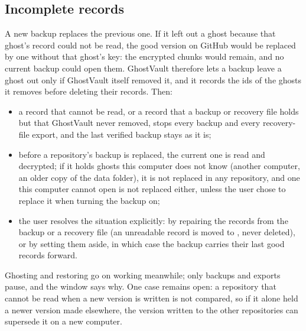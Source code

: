 \subsection{Incomplete records}\label{sec:incomplete}
A new backup replaces the previous one. If it left out a ghost because that ghost's record could not
be read, the good version on GitHub would be replaced by one without that ghost's key: the encrypted
chunks would remain, and no current backup could open them. GhostVault therefore lets a backup leave a
ghost out only if GhostVault itself removed it, and it records the ids of the ghosts it removes before
deleting their records. Then:
\begin{itemize}
\item a record that cannot be read, or a record that a backup or recovery file holds but that
GhostVault never removed, stops every backup and every recovery-file export, and the last verified
backup stays as it is;
\item before a repository's backup is replaced, the current one is read and decrypted; if it holds
ghosts this computer does not know (another computer, an older copy of the data folder), it is not
replaced in any repository, and one this computer cannot open is not replaced either, unless the user
chose to replace it when turning the backup on;
\item the user resolves the situation explicitly: by repairing the records from the backup or a
recovery file (an unreadable record is moved to , never deleted), or by setting them
aside, in which case the backup carries their last good records forward.
\end{itemize}
Ghosting and restoring go on working meanwhile; only backups and exports pause, and the window says
why. One case remains open: a repository that cannot be read when a new version is written is not
compared, so if it alone held a newer version made elsewhere, the version written to the other
repositories can supersede it on a new computer.
